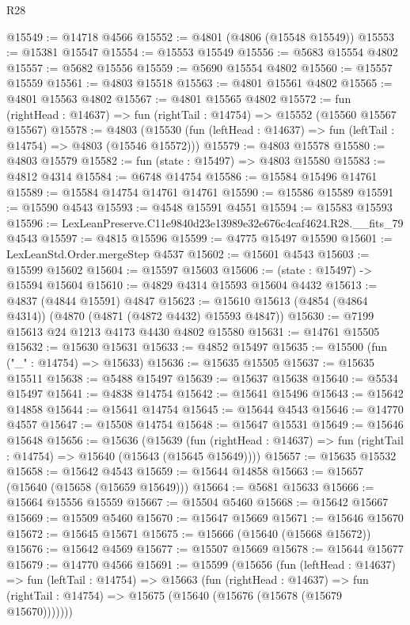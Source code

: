 \begin{lexlean}{R28}
\begin{coremodule}
@15549 := @14718 @4566
@15552 := @4801 (@4806 (@15548 @15549))
@15553 := @15381 @15547
@15554 := @15553 @15549
@15556 := @5683 @15554 @4802
@15557 := @5682 @15556
@15559 := @5690 @15554 @4802
@15560 := @15557 @15559
@15561 := @4803 @15518
@15563 := @4801 @15561 @4802
@15565 := @4801 @15563 @4802
@15567 := @4801 @15565 @4802
@15572 := fun (rightHead : @14637) => fun (rightTail : @14754) => @15552 (@15560 @15567 @15567)
@15578 := @4803
    (@15530 (fun (leftHead : @14637) => fun (leftTail : @14754) => @4803 (@15546 @15572)))
@15579 := @4803 @15578
@15580 := @4803 @15579
@15582 := fun (state : @15497) => @4803 @15580
@15583 := @4812 @4314
@15584 := @6748 @14754
@15586 := @15584 @15496 @14761
@15589 := @15584 @14754 @14761 @14761
@15590 := @15586 @15589
@15591 := @15590 @4543
@15593 := @4548 @15591 @4551
@15594 := @15583 @15593
@15596 := LexLeanPreserve.C11e9840d23e13989e32e676c4caf4624.R28.__fits_79 @4543
@15597 := @4815 @15596
@15599 := @4775 @15497 @15590
@15601 := LexLeanStd.Order.mergeStep @4537
@15602 := @15601 @4543
@15603 := @15599 @15602
@15604 := @15597 @15603
@15606 := (state : @15497) -> @15594 @15604
@15610 := @4829 @4314 @15593 @15604 @4432
@15613 := @4837 (@4844 @15591) @4847
@15623 := @15610 @15613 (@4854 (@4864 @4314)) (@4870 (@4871 (@4872 @4432) @15593 @4847))
@15630 := @7199 @15613 @24 @1213 @4173 @4430 @4802 @15580
@15631 := @14761 @15505
@15632 := @15630 @15631
@15633 := @4852 @15497
@15635 := @15500 (fun ("_" : @14754) => @15633)
@15636 := @15635 @15505
@15637 := @15635 @15511
@15638 := @5488 @15497
@15639 := @15637 @15638
@15640 := @5534 @15497
@15641 := @4838 @14754
@15642 := @15641 @15496
@15643 := @15642 @14858
@15644 := @15641 @14754
@15645 := @15644 @4543
@15646 := @14770 @4557
@15647 := @15508 @14754
@15648 := @15647 @15531
@15649 := @15646 @15648
@15656 := @15636
    (@15639
      (fun (rightHead : @14637) => fun (rightTail : @14754) => @15640 (@15643 (@15645 @15649))))
@15657 := @15635 @15532
@15658 := @15642 @4543
@15659 := @15644 @14858
@15663 := @15657 (@15640 (@15658 (@15659 @15649)))
@15664 := @5681 @15633
@15666 := @15664 @15556 @15559
@15667 := @15504 @5460
@15668 := @15642 @15667
@15669 := @15509 @5460
@15670 := @15647 @15669
@15671 := @15646 @15670
@15672 := @15645 @15671
@15675 := @15666 (@15640 (@15668 @15672))
@15676 := @15642 @4569
@15677 := @15507 @15669
@15678 := @15644 @15677
@15679 := @14770 @4566
@15691 := @15599
    (@15656
      (fun (leftHead : @14637) =>
      fun (leftTail : @14754) =>
      @15663
        (fun (rightHead : @14637) =>
        fun (rightTail : @14754) => @15675 (@15640 (@15676 (@15678 (@15679 @15670)))))))

\end{coremodule}
\end{lexlean}
